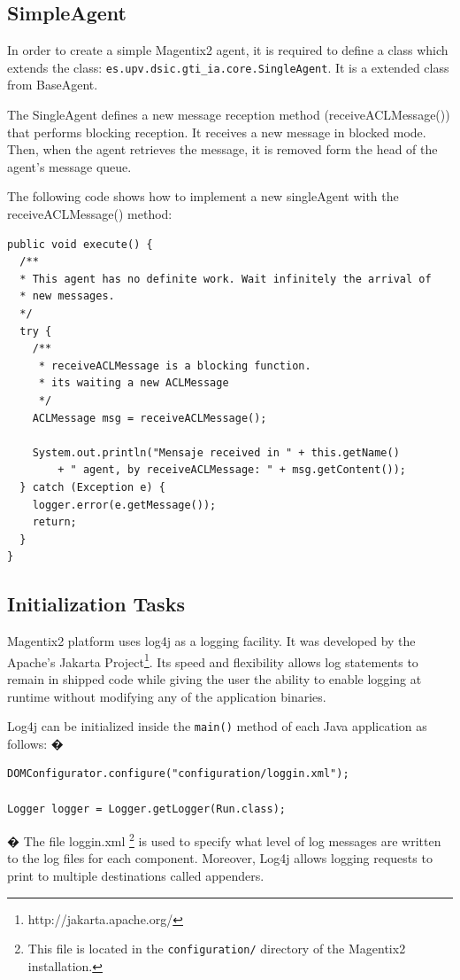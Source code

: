\subsection{SimpleAgent}\label{sec:SimpleAgent}
In order to create a simple Magentix2 agent, it is required to define a class which extends the class: \lstinline|es.upv.dsic.gti_ia.core.SingleAgent|. It is a extended class from BaseAgent.

The SingleAgent defines a new message reception method (receiveACLMessage()) that performs blocking reception. It receives a new message in blocked mode. Then, when the agent retrieves the message, it is removed form the head of the agent's message queue.

The following code shows how to implement a new singleAgent with the receiveACLMessage() method:
\begin{lstlisting}
public void execute() {
  /**
  * This agent has no definite work. Wait infinitely the arrival of
  * new messages.
  */
  try {
	/**
	 * receiveACLMessage is a blocking function.
	 * its waiting a new ACLMessage
	 */
	ACLMessage msg = receiveACLMessage();

	System.out.println("Mensaje received in " + this.getName()
		+ " agent, by receiveACLMessage: " + msg.getContent());
  } catch (Exception e) {
	logger.error(e.getMessage());
	return;
  }
}

\end{lstlisting}
\subsection{Initialization Tasks}
Magentix2 platform uses log4j as a logging facility. It was developed by the  Apache's Jakarta Project\footnote{http://jakarta.apache.org/}. Its speed and flexibility allows log statements to remain in shipped code while giving the user the ability to enable logging at runtime without modifying any of the application binaries.

Log4j can be initialized inside the \lstinline|main()| method of each Java application as follows:
�
\begin{lstlisting}
DOMConfigurator.configure("configuration/loggin.xml");

Logger logger = Logger.getLogger(Run.class);
\end{lstlisting}
�
The file loggin.xml \footnote{This file is located in the \texttt{configuration/} directory of the Magentix2 installation.} is used to specify what level of log messages are written to the log files for each component. Moreover, Log4j allows logging requests to print to multiple destinations called appenders.


